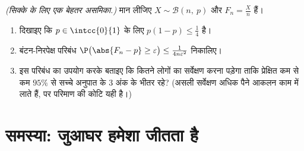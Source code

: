 \begin{exercise}[$\star\star\star$]\label{exo:g12:sums:8}
\emph{(सिक्के के लिए एक बेहतर असमिका.)} मान लीजिए $X \sim \mathcal B(n,\ p)$ और $F_n = \frac Xn$ हैं।
\begin{enumerate}
  \item दिखाइए कि $p \in \intcc{0}{1}$ के लिए $p(1-p) \leq \frac14$ है।
  \item बंटन-निरपेक्ष परिबंध $\P\bigl(\abs{F_n - p} \geq \varepsilon\bigr) \leq
        \frac{1}{4n\varepsilon^2}$ निकालिए।
  \item इस परिबंध का उपयोग करके बताइए कि कितने लोगों का सर्वेक्षण करना पड़ेगा
        ताकि प्रेक्षित  कम से कम $95\%$  से सच्चे
        अनुपात के $3$ अंक के भीतर रहे? (असली सर्वेक्षण अधिक पैने आकलन काम
        में लाते हैं, पर परिमाण की कोटि यही है।)
\end{enumerate}
\end{exercise}

\section{समस्या: जुआघर हमेशा जीतता है}

